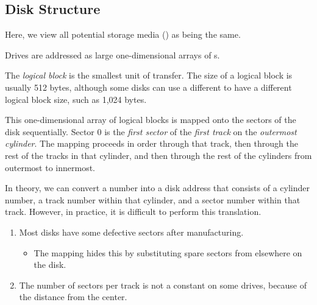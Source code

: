 \subsection{Disk Structure}\label{subsec:Disk_Structure}
Here, we view all potential storage media () as being the same.

Drives are addressed as large one-dimensional arrays of s.

\begin{definition}\label{def:Logical_Block}
  The \emph{logical block} is the smallest unit of transfer.
  The size of a logical block is usually 512 bytes, although some disks can use a different  to have a different logical block size, such as 1,024 bytes.
\end{definition}

This one-dimensional array of logical blocks is mapped onto the sectors of the disk sequentially.
Sector 0 is the \emph{first sector} of the \emph{first track} on the \emph{outermost cylinder}.
The mapping proceeds in order through that track, then through the rest of the tracks in that cylinder, and then through the rest of the cylinders from outermost to innermost.

In theory, we can convert a  number into a disk address that consists of a cylinder number, a track number within that cylinder, and a sector number within that track.
However, in practice, it is difficult to perform this translation.
\begin{enumerate}[noitemsep]
\item Most disks have some defective sectors after manufacturing.
  \begin{itemize}[noitemsep]
  \item The mapping hides this by substituting spare sectors from elsewhere on the disk.
\end{itemize}

\item The number of sectors per track is not a constant on some drives, because of the distance from the center.
\end{enumerate}


